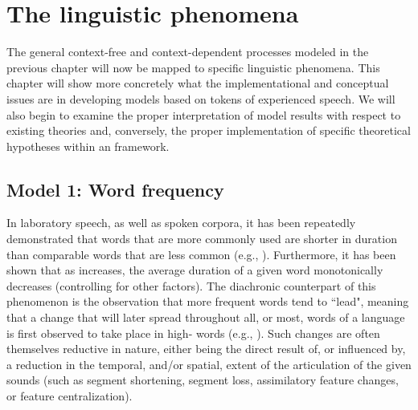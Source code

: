 \chapter{The linguistic phenomena}\label{ch:The-Linguistic-Phenomena}

The general context-free and context-dependent processes modeled in
the previous chapter will now be mapped to specific linguistic phenomena.
This chapter will show more concretely what the implementational and
conceptual issues are in developing  models based on tokens
of experienced speech. We will also begin to examine the proper interpretation
of model results with respect to existing theories and, conversely,
the proper implementation of specific theoretical hypotheses within
an  framework. 

\section{\label{subsec:Word-Frequency}Model 1: Word frequency}

In laboratory speech, as well as spoken corpora, it has been repeatedly
demonstrated that words that are more commonly used are shorter in
duration than comparable words that are less common (e.g., \citealt{Bybee2001,Bybee2002,Bybee2006}).
Furthermore, it has been shown that as  increases, the average
duration of a given word monotonically decreases (controlling for
other factors). The diachronic counterpart of this phenomenon is the
observation that more frequent words tend to “lead",
meaning that a change that will later spread throughout all, or most,
words of a language is first observed to take place in high-
words (e.g., \citealt{Phillips1984}). Such changes are often themselves
reductive in nature, either being the direct result of, or influenced
by, a reduction in the temporal, and/or spatial, extent of the articulation
of the given sounds (such as segment shortening, segment loss, assimilatory
feature changes, or feature centralization).

